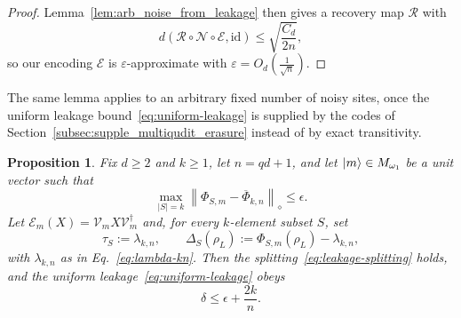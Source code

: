\documentclass[11pt,letterpaper]{article}
\theoremstyle{plain}
\theoremstyle{plain}
\theoremstyle{plain}
\theoremstyle{plain}
\theoremstyle{plain}
\theoremstyle{plain}
\theoremstyle{plain}
\newtheorem{smproposition}[smtheorem]{Proposition}
\theoremstyle{definition}
\theoremstyle{plain}
\begin{document}
\begin{proof}
    Lemma~\ref{lem:arb_noise_from_leakage} then gives a recovery map \(\mathcal R\) with
    \[
        d(\mathcal R\circ\mathcal N\circ\mathcal E,\mathrm{id})
        \leq
        \sqrt{\frac{C_d}{2n}},
    \]
    so our encoding $\mathcal{E}$ is $\varepsilon$-approximate with $\varepsilon=O_{d}\left(\frac{1}{\sqrt{n}}\right)$.
\end{proof}

The same lemma applies to an arbitrary fixed number of noisy sites, once the uniform leakage bound~\eqref{eq:uniform-leakage} is supplied by the codes of Section~\ref{subsec:supple_multiqudit_erasure} 
instead of by exact transitivity.

\begin{smproposition}\label{prop:k-site-uniform-leakage}
    Fix $d\ge2$ and $k\ge1$, let $n=qd+1$, and let $\ket m\in M_{\omega_1}$ be a unit vector such that
    \begin{equation}
    \label{eq:diamond-hypothesis}
        \max_{|S|=k}
        \left\|\Phi_{S,m}-\overline\Phi_{k,n}\right\|_\diamond
        \le\epsilon .
    \end{equation}
    Let $\mathcal E_m(X)=\mathcal{V}_mX\mathcal{V}_m^\dagger$ and, for every $k$-element subset $S$, set
    \[
        \tau_S:=\lambda_{k,n},
        \qquad
        \Delta_S(\rho_L):=\Phi_{S,m}(\rho_L)-\lambda_{k,n},
    \]
    with $\lambda_{k,n}$ as in Eq.~\eqref{eq:lambda-kn}. Then the splitting~\eqref{eq:leakage-splitting} holds, and the uniform leakage~\eqref{eq:uniform-leakage} obeys
    \begin{equation}
    \label{eq:k-leakage-bound}
        \delta\le\epsilon+\frac{2k}n .
    \end{equation}
\end{smproposition}
\end{document}
